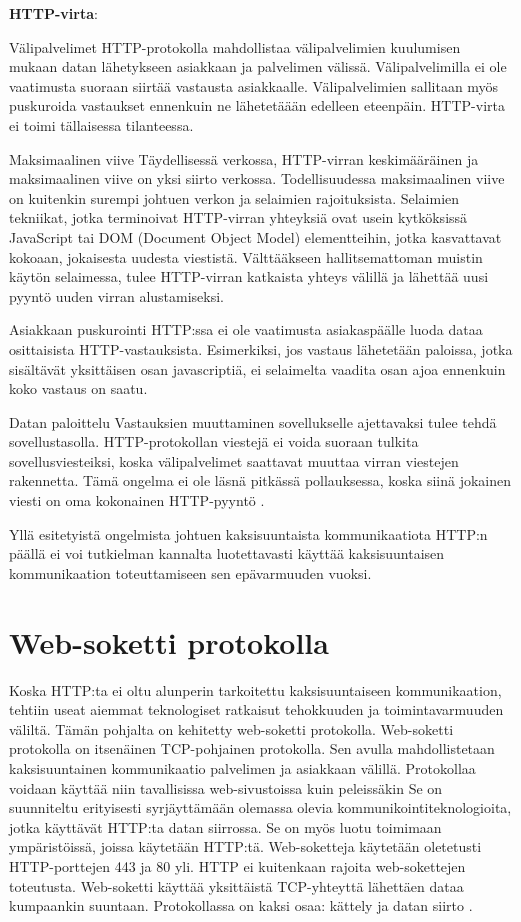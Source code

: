 \documentclass[utf8]{gradu3}
\begin{document}
\textbf{HTTP-virta}:
\begin{desclist}
\item[Välipalvelimet] HTTP-protokolla mahdollistaa välipalvelimien kuulumisen mukaan datan lähetykseen asiakkaan ja palvelimen välissä. Välipalvelimilla ei ole vaatimusta suoraan siirtää vastausta asiakkaalle. Välipalvelimien sallitaan myös puskuroida vastaukset ennenkuin ne lähetetäään edelleen eteenpäin. HTTP-virta ei toimi tällaisessa tilanteessa.
\item[Maksimaalinen viive] Täydellisessä verkossa, HTTP-virran keskimääräinen ja maksimaalinen viive on yksi siirto verkossa. Todellisuudessa maksimaalinen viive on kuitenkin surempi johtuen verkon ja selaimien rajoituksista. Selaimien tekniikat, jotka terminoivat HTTP-virran yhteyksiä ovat usein kytköksissä JavaScript tai DOM (Document Object Model) elementteihin, jotka kasvattavat kokoaan, jokaisesta uudesta viestistä. Välttääkseen hallitsemattoman muistin käytön selaimessa, tulee HTTP-virran katkaista yhteys välillä ja lähettää uusi pyyntö uuden virran alustamiseksi.
\item[Asiakkaan puskurointi] HTTP:ssa ei ole vaatimusta asiakaspäälle luoda dataa osittaisista  HTTP-vastauksista. Esimerkiksi, jos vastaus lähetetään paloissa, jotka sisältävät yksittäisen osan javascriptiä, ei selaimelta vaadita osan ajoa ennenkuin koko vastaus on saatu.
\item[Datan paloittelu] Vastauksien muuttaminen sovellukselle ajettavaksi tulee tehdä sovellustasolla. HTTP-protokollan viestejä ei voida suoraan tulkita sovellusviesteiksi, koska välipalvelimet saattavat muuttaa virran viestejen rakennetta. Tämä ongelma ei ole läsnä pitkässä pollauksessa, koska siinä jokainen viesti on oma kokonainen HTTP-pyyntö \parencite[s. 2]{long_polling}. 
\end{desclist}

Yllä esitetyistä ongelmista johtuen kaksisuuntaista kommunikaatiota HTTP:n päällä ei voi tutkielman kannalta luotettavasti käyttää kaksisuuntaisen kommunikaation toteuttamiseen sen epävarmuuden vuoksi.



\section{Web-soketti protokolla}
Koska HTTP:ta ei oltu alunperin tarkoitettu kaksisuuntaiseen kommunikaation, tehtiin useat aiemmat teknologiset ratkaisut tehokkuuden ja toimintavarmuuden väliltä. Tämän pohjalta on kehitetty web-soketti protokolla. Web-soketti protokolla on itsenäinen TCP-pohjainen protokolla. Sen avulla mahdollistetaan kaksisuuntainen kommunikaatio palvelimen ja asiakkaan välillä. Protokollaa voidaan käyttää niin tavallisissa web-sivustoissa kuin peleissäkin  Se on suunniteltu erityisesti syrjäyttämään olemassa olevia kommunikointiteknologioita, jotka käyttävät HTTP:ta datan siirrossa. Se on myös luotu toimimaan ympäristöissä, joissa käytetään HTTP:tä. Web-soketteja käytetään oletetusti  HTTP-porttejen 443 ja 80 yli. HTTP ei kuitenkaan rajoita web-sokettejen toteutusta.  Web-soketti käyttää yksittäistä TCP-yhteyttä lähettäen dataa kumpaankin suuntaan. Protokollassa on kaksi osaa: kättely ja datan siirto \parencite[s. 1.1]{websocket}.
\end{document}
